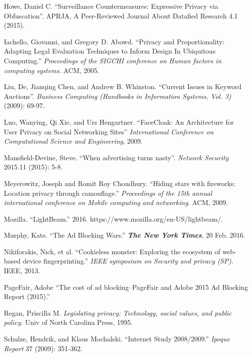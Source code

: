 \documentclass[conference]{IEEEtran}
\begin{document}
\begin{thebibliography}{99}
 Howe, Daniel C. “Surveillance Countermeasures: Expressive Privacy via Obfuscation”. APRJA, A Peer-Reviewed Journal About Datafied Research 4.1 (2015).

 Iachello, Giovanni, and Gregory D. Abowd. “Privacy and Proportionality: Adapting Legal Evaluation Techniques to Inform Design In Ubiquitous Computing.” \textit{Proceedings of the SIGCHI conference on Human factors in computing systems}. ACM, 2005.

 Liu, De, Jianqing Chen, and Andrew B. Whinston. “Current Issues in Keyword Auctions”. \textit{Business Computing (Handbooks in Information Systems, Vol. 3)} (2009): 69-97.

 Luo, Wanying, Qi Xie, and Urs Hengartner. “FaceCloak: An Architecture for User Privacy on Social Networking Sites” \textit{International Conference on Computational Science and Engineering}, 2009.

 Mansfield-Devine, Steve. “When advertising turns nasty”. \textit{Network Security} 2015.11 (2015): 5-8.

 Meyerowitz, Joseph and Romit Roy Choudhury. “Hiding stars with fireworks: Location privacy through camouflage.” \textit{Proceedings of the 15th annual international conference on Mobile computing and networking}. ACM, 2009.

 Mozilla. “LightBeam.” 2016. https://www.mozilla.org/en-US/lightbeam/.

 Murphy, Kate. “The Ad Blocking Wars.” \textbf{\textit{The New York Times}}, 20 Feb. 2016.

 Nikiforakis, Nick, et al. “Cookieless monster: Exploring the ecosystem of web-based device fingerprinting.” \textit{IEEE symposium on Security and privacy (SP)}. IEEE, 2013.

 PageFair, Adobe “The cost of ad blocking–PageFair and Adobe 2015 Ad Blocking Report (2015).”
%

 Regan, Priscilla M. \textit{Legislating privacy: Technology, social values, and public policy.} Univ of North Carolina Press, 1995.

 Schulze, Hendrik, and Klaus Mochalski. “Internet Study 2008/2009.” \textit{Ipoque Report} 37 (2009): 351-362.


\end{thebibliography}
\end{document}
